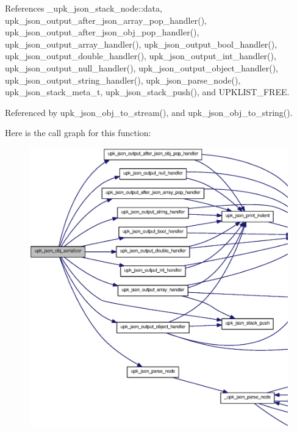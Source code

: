 References \_\-upk\_\-json\_\-stack\_\-node::data, upk\_\-json\_\-output\_\-after\_\-json\_\-array\_\-pop\_\-handler(), upk\_\-json\_\-output\_\-after\_\-json\_\-obj\_\-pop\_\-handler(), upk\_\-json\_\-output\_\-array\_\-handler(), upk\_\-json\_\-output\_\-bool\_\-handler(), upk\_\-json\_\-output\_\-double\_\-handler(), upk\_\-json\_\-output\_\-int\_\-handler(), upk\_\-json\_\-output\_\-null\_\-handler(), upk\_\-json\_\-output\_\-object\_\-handler(), upk\_\-json\_\-output\_\-string\_\-handler(), upk\_\-json\_\-parse\_\-node(), upk\_\-json\_\-stack\_\-meta\_\-t, upk\_\-json\_\-stack\_\-push(), and UPKLIST\_\-FREE.



Referenced by upk\_\-json\_\-obj\_\-to\_\-stream(), and upk\_\-json\_\-obj\_\-to\_\-string().



Here is the call graph for this function:\nopagebreak
\begin{figure}[H]
\begin{center}
\leavevmode
\includegraphics[width=400pt]{upk__json_8c_af1db52886c19222aa7efc1217809d8a3_cgraph}
\end{center}
\end{figure}




